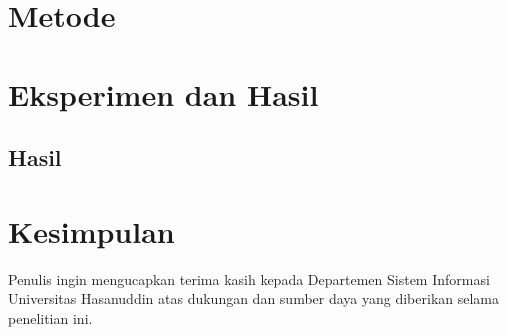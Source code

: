 \documentclass{iopjournal}
\begin{document}
\section{Metode}
\section{Eksperimen dan Hasil}

\subsection{Hasil}

\section{Kesimpulan}
\label{sec:conclusion}

\ack
Penulis ingin mengucapkan terima kasih kepada Departemen Sistem Informasi Universitas Hasanuddin atas dukungan dan sumber daya yang diberikan selama penelitian ini.
\end{document}
